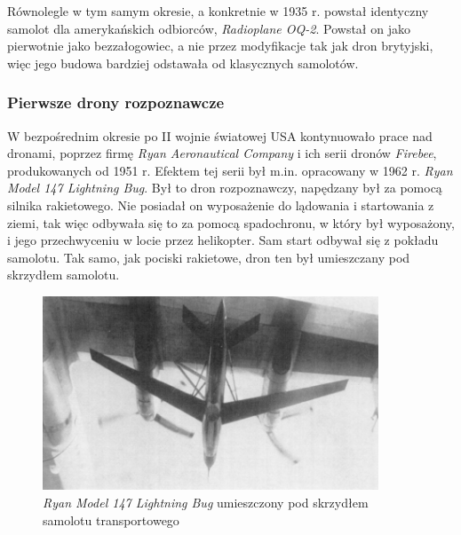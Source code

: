 Równolegle w tym samym okresie, a konkretnie w 1935 r. powstał identyczny samolot dla amerykańskich odbiorców, \textit{Radioplane OQ-2}. Powstał on jako pierwotnie jako bezzałogowiec, a nie przez modyfikacje tak jak dron brytyjski, więc jego budowa bardziej odstawała od klasycznych samolotów.\cite{queen-bee}\cite{dron-ibuk}

\subsubsection{Pierwsze drony rozpoznawcze}
W bezpośrednim okresie po II wojnie światowej USA kontynuowało prace nad dronami, poprzez firmę \textit{Ryan Aeronautical Company} i ich serii dronów \textit{Firebee}, produkowanych od 1951 r. Efektem tej serii był m.in. opracowany w 1962 r. \textit{Ryan Model 147 Lightning Bug}. Był to dron rozpoznawczy, napędzany był za pomocą silnika rakietowego. Nie posiadał on wyposażenie do lądowania i startowania z ziemi, tak więc odbywała się to za pomocą spadochronu, w który był wyposażony, i jego przechwyceniu w locie przez helikopter. Sam start odbywał się z pokładu samolotu. Tak samo, jak pociski rakietowe, dron ten był umieszczany pod skrzydłem samolotu.

\begin{figure}[!ht]
\begin{center}
  \includegraphics[width=10cm]{./Obrazy/Model_147_RPV.png}
  \caption{\textit{Ryan Model 147 Lightning Bug} umieszczony pod skrzydłem samolotu transportowego}
\end{center}
\end{figure}

